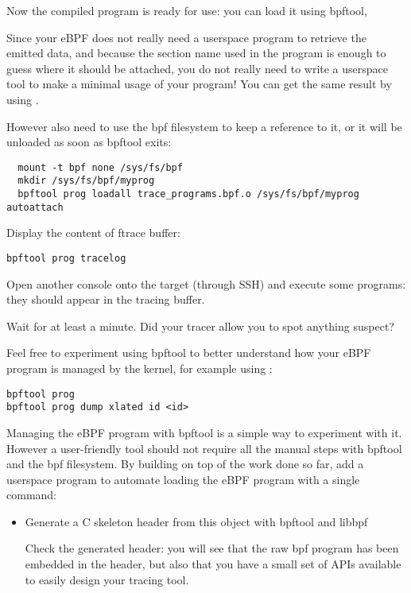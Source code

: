 Now the compiled program is ready for use: you can load it using bpftool,

Since your eBPF does not really need a userspace program to retrieve the
emitted data, and because the section name used in the program is enough to
guess where it should be attached, you do not really need to write a
userspace tool to make a minimal usage of your program! You can get the
same result by using .

However also need to use the bpf filesystem to keep a reference to it, or
it will be unloaded as soon as bpftool exits:

\begin{verbatim}
  mount -t bpf none /sys/fs/bpf
  mkdir /sys/fs/bpf/myprog
  bpftool prog loadall trace_programs.bpf.o /sys/fs/bpf/myprog autoattach
\end{verbatim}

Display the content of ftrace buffer:

\begin{verbatim}
bpftool prog tracelog
\end{verbatim}

Open another console onto the target (through SSH) and execute some
programs: they should appear in the tracing buffer.

Wait for at least a minute. Did your tracer allow you to spot anything
suspect?

Feel free to experiment using bpftool to better understand how your eBPF
program is managed by the kernel, for example using :

\begin{verbatim}
bpftool prog
bpftool prog dump xlated id <id>
\end{verbatim}

Managing the eBPF program with bpftool is a simple way to experiment with
it. However a user-friendly tool should not require all the manual steps
with bpftool and the bpf filesystem. By building on top of the work done so
far, add a userspace program to automate loading the eBPF program with a
single command:

\begin{itemize}
  \item Generate a C skeleton header from this object with bpftool and libbpf
  Check the generated header: you will see that the raw bpf program has been
  embedded in the header, but also that you have a small set of APIs available
  to easily design your tracing tool.
\end{itemize}

